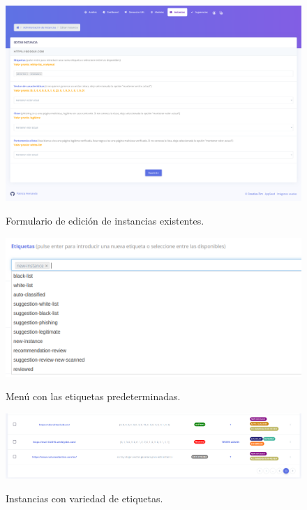 \begin{figure}[h]
	\caption[Manual de usuario: editar instancia]{Formulario de edición de instancias existentes.}
	\centering
	\includegraphics[width=\textwidth]{../img/anexos/user_guide/6_edit_instance}
	\label{e-5:edit-instance}
\end{figure}

\begin{figure}[h]
	\caption[Manual de usuario: etiquetas predeterminadas]{Menú con las etiquetas predeterminadas.}
	\centering
	\includegraphics[width=\textwidth]{../img/anexos/user_guide/6_labels}
	\label{e-6:labels}
\end{figure}

\begin{figure}[h]
	\caption[Manual de usuario: ejemplos de etiquetas]{Instancias con variedad de etiquetas.}
	\centering
	\includegraphics[width=\textwidth]{../img/anexos/user_guide/6_instances_more_labels}
	\label{e-6:more-labels}
\end{figure}

